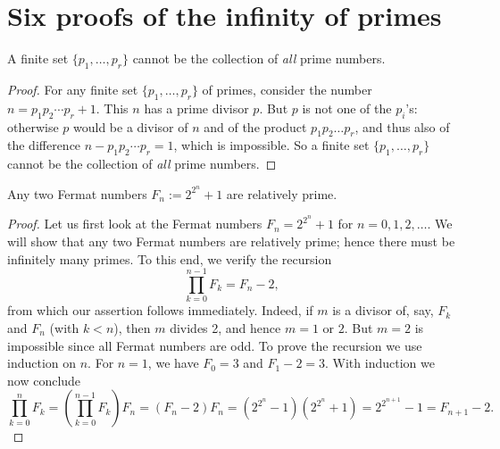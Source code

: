 
\chapter{Six proofs of the infinity of primes}

\begin{theorem}
    \label{thm:euclids_proof}
    \leanok
    A finite set $\{p_1, \dots, p_r\}$ cannot be the collection of
    \emph{all} prime numbers.
\end{theorem}
\begin{proof}
    \leanok
    For any finite set $\{p_1, \dots, p_r\}$ of primes, consider the number
    $n = p_1 p_2 \cdots p_r + 1$. This $n$ has a prime divisor $p$.
    But $p$ is not one of the $p_i$'s: otherwise $p$ would be a divisor of $n$ and of the product
    $p_1p_2\dots p_r$, and thus also of the difference $n - p_1 p_2 \cdots p_r = 1$,
    which is impossible. So a finite set $\{p_1, \dots, p_r\}$ cannot be the collection of
    \emph{all} prime numbers.
\end{proof}


\begin{theorem}
    \label{thm:second_proof}
    \leanok
    Any two Fermat numbers $F_n := 2^{2^n} + 1$ are relatively prime.
\end{theorem}
\begin{proof}
    \leanok
    Let us first look at the Fermat numbers \(F_n = 2^{2^n} +1\) for \(n = 0,1,2,\dots\).
    We will show that any two Fermat numbers are relatively prime;
    hence there must be infinitely many primes. To this end, we verify the recursion
    \[
    \prod_{k=0}^{n-1} F_k = F_n - 2,
    \]
    from which our assertion follows immediately.
    Indeed, if \(m\) is a divisor of, say,
    \(F_k\) and \(F_n\) (with \(k < n\)), then \(m\) divides 2, and hence \(m = 1\) or \(2\).
    But \(m = 2\) is impossible since all Fermat numbers are odd.
    To prove the recursion we use induction on \(n\).
    For \(n = 1\), we have \(F_0 = 3\) and \(F_1 - 2 = 3\).
    With induction we now conclude
    \[
    \prod_{k=0}^{n} F_k = \left( \prod_{k=0}^{n-1} F_k \right) F_n =
        (F_n - 2)F_n = (2^{2^n} - 1)(2^{2^n} + 1) = 2^{2^{n+1}} - 1 = F_{n+1} - 2.
    \]
\end{proof}

